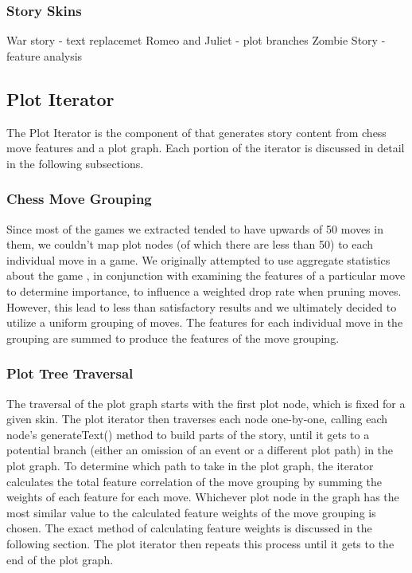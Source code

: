 \documentclass[journal]{./IEEEtran}
\begin{document}
\subsubsection{Story Skins}
War story - text replacemet
Romeo and Juliet - plot branches
Zombie Story - feature analysis

\subsection{Plot Iterator}
The Plot Iterator is the component of \sysname{} that generates story content from chess move features and a plot graph. Each portion of the iterator is discussed in detail in the following subsections. 

\subsubsection{Chess Move Grouping}
Since most of the games we extracted tended to have upwards of 50 moves in them, we couldn’t map plot nodes (of which there are less than 50) to each individual move in a game. We originally attempted to use aggregate statistics about the game , in conjunction with examining the features of a particular move to determine importance, to influence a weighted drop rate when pruning moves. However, this lead to less than satisfactory results and we ultimately decided to utilize a uniform grouping of moves. The features for each individual move in the grouping are summed to produce the features of the move grouping. 

\subsubsection{Plot Tree Traversal}
The traversal of the plot graph starts with the first plot node, which is fixed for a given skin. The plot iterator then traverses each node one-by-one, calling each node’s generateText() method to build parts of the story, until it gets to a potential branch (either an omission of an event or a different plot path) in the plot graph. To determine which path to take in the plot graph, the iterator calculates the total feature correlation of the move grouping by summing the weights of each feature for each move. Whichever plot node in the graph has the most similar value to the calculated feature weights of the move grouping is chosen. The exact method of calculating feature weights is discussed in the following section. The plot iterator then repeats this process until it gets to the end of the plot graph.
\end{document}
